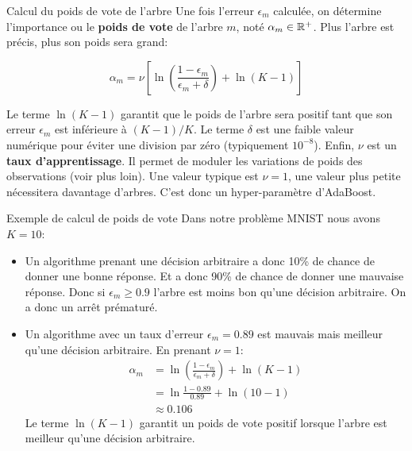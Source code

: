 \begin{frame}{Calcul du poids de vote de l'arbre}
	Une fois l'erreur $\epsilon_m$ calculée, on détermine l'importance ou le \textbf{poids de vote} de l'arbre $m$, noté $\alpha_m \in \mathbb{R}^+$. Plus l'arbre est précis, plus son poids sera grand:
	
	\begin{equation*}
		\alpha_m = \nu \left[\ln \left( \frac{1 - \epsilon_m}{\epsilon_m + \delta} \right) + \ln(K - 1)\right]
	\end{equation*}
	
	\pause
	\vspace{0.3cm}
	Le terme $\ln(K - 1)$ garantit que le poids de l'arbre sera positif tant que son erreur $\epsilon_m$ est inférieure à $(K-1)/K$. Le terme $\delta$ est une faible valeur numérique pour éviter une division par zéro (typiquement $10^{-8}$). Enfin, $\nu$ est un \textbf{taux d'apprentissage}. Il permet de moduler les variations de poids des observations (voir plus loin). Une valeur typique est $\nu = 1$, une valeur plus petite nécessitera davantage d'arbres. C'est donc un hyper-paramètre d'AdaBoost.
\end{frame}

\begin{frame}{Exemple de calcul de poids de vote}
	Dans notre problème MNIST nous avons $K = 10$:
	\begin{itemize}
		\item Un algorithme prenant une décision arbitraire a donc 10\% de chance de donner une bonne réponse. Et a donc 90\% de chance de donner une mauvaise réponse. Donc si $\epsilon_m \ge 0.9$ l'arbre est moins bon qu'une décision arbitraire. On a donc un arrêt prématuré.
		\item Un algorithme avec un taux d'erreur $\epsilon_m = 0.89$ est mauvais mais meilleur qu'une décision arbitraire. En prenant $\nu = 1$:
		\begin{equation*}
			\begin{aligned}
				\alpha_m 
				&= \ln \left( \frac{1 - \epsilon_m}{\epsilon_m + \delta} \right) + \ln(K - 1) \\
				&= \ln \frac{1 - 0.89}{0.89} + \ln(10 - 1) \\
				&\approx 0.106
			\end{aligned}
		\end{equation*}
		Le terme $\ln(K - 1)$ garantit un poids de vote positif lorsque l'arbre est meilleur qu'une décision arbitraire.
	\end{itemize}
\end{frame}

